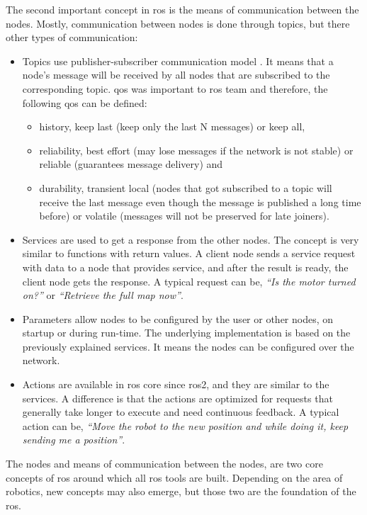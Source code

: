 The second important concept in \ac{ros} is the means of communication between the nodes.
Mostly, communication between nodes is done through topics, but there other types of communication:
\begin{itemize}
    \item Topics use publisher-subscriber communication model \cite{chen_beaconvey_2018}.
    It means that a node's message will be received by all nodes that are subscribed to the corresponding topic. 
    \ac{qos} was important to \ac{ros} team and therefore, the following \ac{qos} can be defined:
    \begin{itemize}
        \item history, keep last (keep only the last N messages) or keep all,
        \item reliability, best effort (may lose messages if the network is not stable) or reliable (guarantees message delivery) and
        \item durability, transient local (nodes that got subscribed to a topic will receive the last message even though the message is published a long time before) or volatile (messages will not be preserved for late joiners).
    \end{itemize}
    \item Services are used to get a response from the other nodes.
    The concept is very similar to functions with return values.
    A client node sends a service request with data to a node that provides service, and after the result is ready, the client node gets the response.
    A typical request can be, \textit{``Is the motor turned on?''} or \textit{``Retrieve the full map now''}.
    \item Parameters allow nodes to be configured by the user or other nodes, on startup or during run-time.
    The underlying implementation is based on the previously explained services.
    It means the nodes can be configured over the network.
    \item Actions are available in \ac{ros} core since \ac{ros2}, and they are similar to the services.
    A difference is that the actions are optimized for requests that generally take longer to execute and need continuous feedback. A typical action can be, \textit{``Move the robot to the new position and while doing it, keep sending me a position''}.
\end{itemize}

The nodes and means of communication between the nodes, are two core concepts of \ac{ros} around which all \ac{ros} tools are built.
Depending on the area of robotics, new concepts may also emerge, but those two are the foundation of the \ac{ros}.

